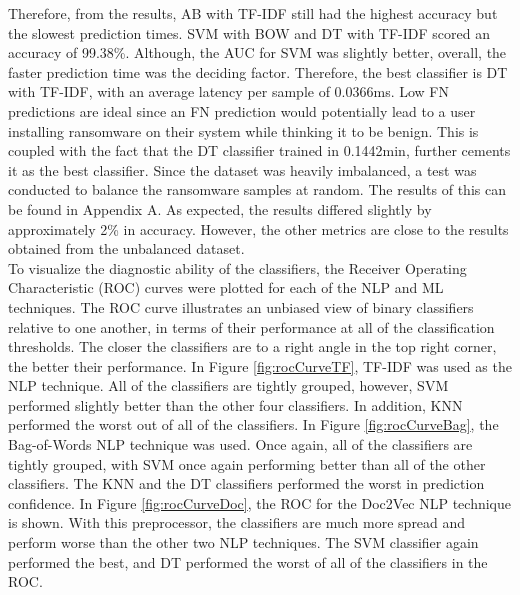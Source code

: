 \documentclass[conference]{IEEEtran}
\begin{document}
Therefore, from the results, AB with TF-IDF still had the highest accuracy but the slowest prediction times. SVM with BOW and DT with TF-IDF scored an accuracy of 99.38\%. Although, the AUC for SVM was slightly better, overall, the faster prediction time was the deciding factor. Therefore, the best classifier is DT with TF-IDF, with an average latency per sample of 0.0366ms. Low FN predictions are ideal since an FN prediction would potentially lead to a user installing ransomware on their system while thinking it to be benign. This is coupled with the fact that the DT classifier trained in 0.1442min, further cements it as the best classifier. Since the dataset was heavily imbalanced, a test was conducted to balance the ransomware samples at random. The results of this can be found in Appendix A. As expected, the results differed slightly by approximately 2\% in accuracy. However, the other metrics are close to the results obtained from the unbalanced dataset.\\

To visualize the diagnostic ability of the classifiers, the Receiver Operating Characteristic (ROC) curves were plotted for each of the NLP and ML techniques. The ROC curve illustrates an unbiased view of binary classifiers relative to one another, in terms of their performance at all of the classification thresholds. The closer the classifiers are to a right angle in the top right corner, the better their performance. In Figure \ref{fig:rocCurveTF}, TF-IDF was used as the NLP technique. All of the classifiers are tightly grouped, however, SVM performed slightly better than the other four classifiers. In addition, KNN performed the worst out of all of the classifiers.
In Figure \ref{fig:rocCurveBag}, the Bag-of-Words NLP technique was used. Once again, all of the classifiers are tightly grouped, with SVM once again performing better than all of the other classifiers. The KNN and the DT classifiers performed the worst in prediction confidence.
In Figure \ref{fig:rocCurveDoc}, the ROC for the Doc2Vec NLP technique is shown. With this preprocessor, the classifiers are much more spread and perform worse than the other two NLP techniques. The SVM classifier again performed the best, and DT performed the worst of all of the classifiers in the ROC.  \\ 
\end{document}
